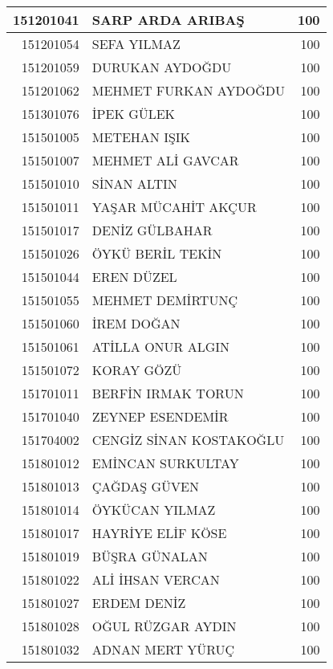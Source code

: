 \documentclass[12pt]{article}
\begin{document}
\begin{longtable}{||r||l||r||}
    \midrule
    151201041 & SARP ARDA ARIBAŞ & 100 \\
    \midrule
    151201054 & SEFA YILMAZ & 100 \\
    \midrule
    151201059 & DURUKAN AYDOĞDU & 100 \\
    \midrule
    151201062 & MEHMET FURKAN AYDOĞDU & 100 \\
    \midrule
    151301076 & İPEK GÜLEK & 100 \\
    \midrule
    151501005 & METEHAN IŞIK & 100 \\
    \midrule
    151501007 & MEHMET ALİ GAVCAR & 100 \\
    \midrule
    151501010 & SİNAN ALTIN & 100 \\
    \midrule
    151501011 & YAŞAR MÜCAHİT AKÇUR & 100 \\
    \midrule
    151501017 & DENİZ GÜLBAHAR & 100 \\
    \midrule
    151501026 & ÖYKÜ BERİL TEKİN & 100 \\
    \midrule
    151501044 & EREN DÜZEL & 100 \\
    \midrule
    151501055 & MEHMET DEMİRTUNÇ & 100 \\
    \midrule
    151501060 & İREM DOĞAN & 100 \\
    \midrule
    151501061 & ATİLLA ONUR ALGIN & 100 \\
    \midrule
    151501072 & KORAY GÖZÜ & 100 \\
    \midrule
    151701011 & BERFİN IRMAK TORUN & 100 \\
    \midrule
    151701040 & ZEYNEP ESENDEMİR & 100 \\
    \midrule
    151704002 & CENGİZ SİNAN KOSTAKOĞLU & 100 \\
    \midrule
    151801012 & EMİNCAN SURKULTAY & 100 \\
    \midrule
    151801013 & ÇAĞDAŞ GÜVEN & 100 \\
    \midrule
    151801014 & ÖYKÜCAN YILMAZ & 100 \\
    \midrule
    151801017 & HAYRİYE ELİF KÖSE & 100 \\
    \midrule
    151801019 & BÜŞRA GÜNALAN & 100 \\
    \midrule
    151801022 & ALİ İHSAN VERCAN & 100 \\
    \midrule
    151801027 & ERDEM DENİZ & 100 \\
    \midrule
    151801028 & OĞUL RÜZGAR AYDIN & 100 \\
    \midrule
    151801032 & ADNAN MERT YÜRUÇ & 100 \\

\end{longtable}
\end{document}
